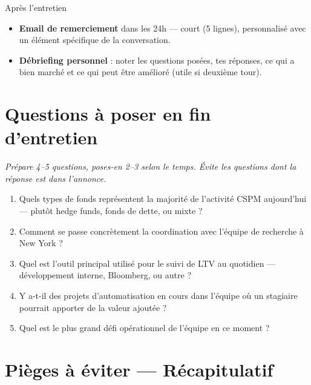 \documentclass[11pt,a4paper]{article}
\begin{document}
\begin{graybox}{Apr\`es l'entretien}
\begin{itemize}[nosep, leftmargin=12pt]
\item[$\square$] \textbf{Email de remerciement} dans les 24h --- court (5 lignes), personnalis\'e
      avec un \'el\'ement sp\'ecifique de la conversation.
\item[$\square$] \textbf{D\'ebriefing personnel} : noter les questions pos\'ees, tes r\'eponses,
      ce qui a bien march\'e et ce qui peut \^etre am\'elior\'e (utile si deuxi\`eme tour).
\end{itemize}
\end{graybox}

\vspace{8pt}

\section{Questions \`a poser en fin d'entretien}

\textcolor{warmgray}{\textit{Pr\'epare 4--5 questions, poses-en 2--3 selon le temps. \'Evite
les questions dont la r\'eponse est dans l'annonce.}}

\begin{enumerate}[leftmargin=16pt]
\item \og Quels types de fonds repr\'esentent la majorit\'e de l'activit\'e CSPM
      aujourd'hui --- plut\^ot hedge funds, fonds de dette, ou mixte ? \fg{}
\item \og Comment se passe concr\`etement la coordination avec l'\'equipe de
      recherche \`a New York ? \fg{}
\item \og Quel est l'outil principal utilis\'e pour le suivi de LTV au quotidien
      --- d\'eveloppement interne, Bloomberg, ou autre ? \fg{}
\item \og Y a-t-il des projets d'automatisation en cours dans l'\'equipe o\`u un
      stagiaire pourrait apporter de la valeur ajout\'ee ? \fg{}
\item \og Quel est le plus grand d\'efi op\'erationnel de l'\'equipe en ce moment ? \fg{}
\end{enumerate}

\vspace{8pt}

\section{Pi\`eges \`a \'eviter --- R\'ecapitulatif}
\end{document}
